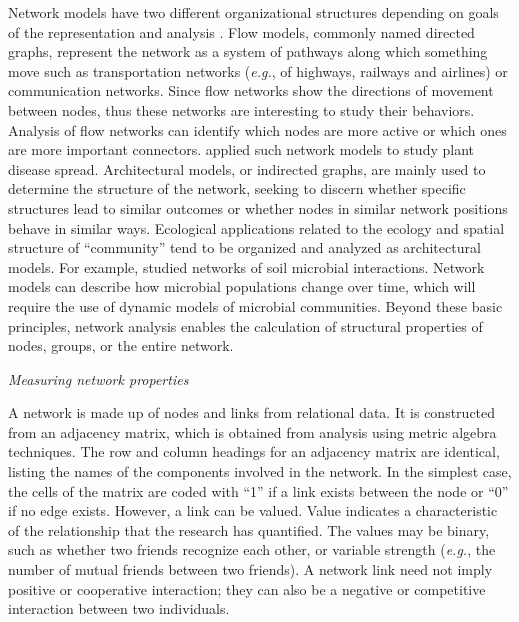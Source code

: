 Network models have two different organizational structures depending on goals of the representation and analysis \citep{borgatti2013analyzing}. Flow models, commonly named directed graphs, represent the network as a system of pathways along which something move such as transportation networks (\textit{e.g.}, of highways, railways and airlines) or communication networks. Since flow networks show the directions of movement between nodes, thus these networks are interesting to study their behaviors. Analysis of flow networks can identify which nodes are more active or which ones are more important connectors. \citet{Jeger:2007tn, Shaw:2014cka} applied such network models to study plant disease spread. Architectural models, or indirected graphs, are mainly used to determine the structure of the network, seeking to discern whether specific structures lead to similar outcomes or whether nodes in similar network positions behave in similar ways. Ecological applications related to the ecology and spatial structure of ``community'' tend to be organized and analyzed as architectural models. For example, \citet{Faust:2012dk} studied networks of soil microbial interactions. Network models can describe how microbial populations change over time, which will require the use of dynamic models of microbial communities. Beyond these basic principles, network analysis enables the calculation of structural properties of nodes, groups, or the entire network.

\textit{Measuring network properties}

A network is made up of nodes and links from relational data. It is constructed from an adjacency matrix, which is obtained from analysis using metric algebra techniques. The row and column headings for an adjacency matrix are identical, listing the names of the components involved in the network. In the simplest case, the cells of the matrix are coded with ``1'' if a link exists between the node or ``0'' if no edge exists. However, a link can be valued. Value indicates a characteristic of the relationship that the research has quantified. The values may be binary, such as whether two friends recognize each other, or variable strength (\textit{e.g.}, the number of mutual friends between two friends). A network link need not imply positive or cooperative interaction; they can also be a negative or competitive interaction between two individuals. 

